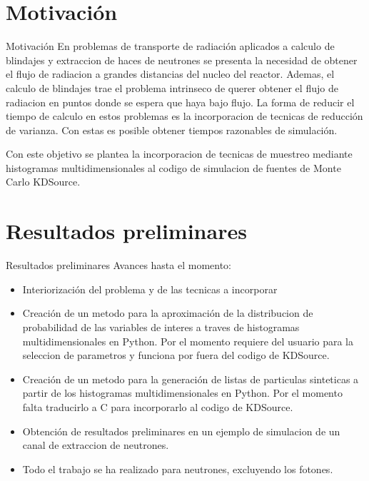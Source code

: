 \documentclass[aspectratio=169,english]{beamer}
\begin{document}
\section{Motivación}
\begin{frame}{Motivación}
    En problemas de transporte de radiación aplicados a calculo de blindajes y extraccion de 
    haces de neutrones se presenta la necesidad de obtener el flujo de radiacion a grandes 
    distancias del nucleo del reactor. Ademas, el calculo de blindajes trae el problema intrinseco 
    de querer obtener el flujo de radiacion en puntos donde se espera que haya bajo flujo.
    La forma de reducir el tiempo de calculo en estos problemas es la incorporacion de tecnicas de 
    reducción de varianza. Con estas es posible obtener tiempos razonables de simulación.
    
    Con este objetivo se plantea la incorporacion de tecnicas de muestreo mediante histogramas 
    multidimensionales al codigo de simulacion de fuentes de Monte Carlo KDSource.
\end{frame}

\section{Resultados preliminares}
\begin{frame}{Resultados preliminares}
    Avances hasta el momento:
    \begin{itemize}
        \item Interiorización del problema y de las tecnicas a incorporar
        \item Creación de un metodo para la aproximación de la distribucion de probabilidad de las variables de interes a traves de histogramas multidimensionales en Python. Por el momento requiere del usuario para la seleccion de parametros y funciona por fuera del codigo de KDSource. 
        \item Creación de un metodo para la generación de listas de particulas sinteticas a partir de los histogramas multidimensionales en Python. Por el momento falta traducirlo a C para incorporarlo al codigo de KDSource.
        \item Obtención de resultados preliminares en un ejemplo de simulacion de un canal de extraccion de neutrones.
        \item Todo el trabajo se ha realizado para neutrones, excluyendo los fotones.
    \end{itemize}

\end{frame}
\end{document}

